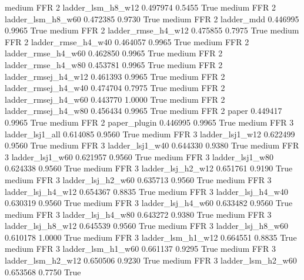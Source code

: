    medium      FFR                 2   ladder_lsm_h8_w12   0.497974      0.5455    True
    medium      FFR                 2   ladder_lsm_h8_w60   0.472385      0.9730    True
    medium      FFR                 2          ladder_mdd   0.446995      0.9965    True
    medium      FFR                 2  ladder_rmse_h4_w12   0.475855      0.7975    True
    medium      FFR                 2  ladder_rmse_h4_w40   0.464057      0.9965    True
    medium      FFR                 2  ladder_rmse_h4_w60   0.462850      0.9965    True
    medium      FFR                 2  ladder_rmse_h4_w80   0.453781      0.9965    True
    medium      FFR                 2 ladder_rmsej_h4_w12   0.461393      0.9965    True
    medium      FFR                 2 ladder_rmsej_h4_w40   0.474704      0.7975    True
    medium      FFR                 2 ladder_rmsej_h4_w60   0.443770      1.0000    True
    medium      FFR                 2 ladder_rmsej_h4_w80   0.456434      0.9965    True
    medium      FFR                 2               paper   0.449417      0.9965    True
    medium      FFR                 2        paper_plugin   0.446995      0.9965    True
    medium      FFR                 3     ladder_lsj1_all   0.614085      0.9560    True
    medium      FFR                 3     ladder_lsj1_w12   0.622499      0.9560    True
    medium      FFR                 3     ladder_lsj1_w40   0.644330      0.9380    True
    medium      FFR                 3     ladder_lsj1_w60   0.621957      0.9560    True
    medium      FFR                 3     ladder_lsj1_w80   0.624338      0.9560    True
    medium      FFR                 3   ladder_lsj_h2_w12   0.651761      0.9190    True
    medium      FFR                 3   ladder_lsj_h2_w60   0.635713      0.9560    True
    medium      FFR                 3   ladder_lsj_h4_w12   0.654367      0.8835    True
    medium      FFR                 3   ladder_lsj_h4_w40   0.630319      0.9560    True
    medium      FFR                 3   ladder_lsj_h4_w60   0.633482      0.9560    True
    medium      FFR                 3   ladder_lsj_h4_w80   0.643272      0.9380    True
    medium      FFR                 3   ladder_lsj_h8_w12   0.645539      0.9560    True
    medium      FFR                 3   ladder_lsj_h8_w60   0.610178      1.0000    True
    medium      FFR                 3   ladder_lsm_h1_w12   0.664551      0.8835    True
    medium      FFR                 3   ladder_lsm_h1_w60   0.661137      0.9295    True
    medium      FFR                 3   ladder_lsm_h2_w12   0.650506      0.9230    True
    medium      FFR                 3   ladder_lsm_h2_w60   0.653568      0.7750    True
